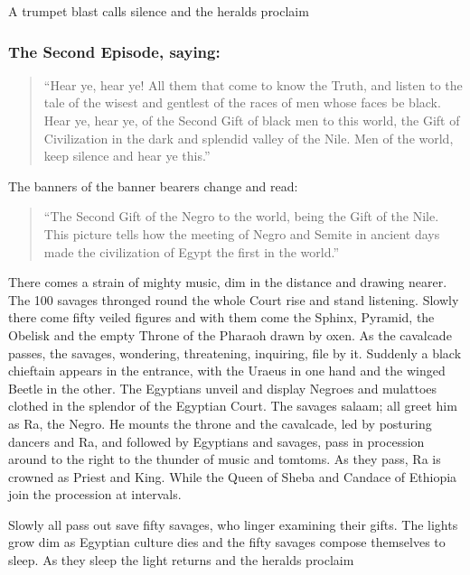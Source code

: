 \documentclass[letterpaper,10pt,english]{jupyterBook}
\begin{document}
\sphinxAtStartPar
A trumpet blast calls silence and the heralds proclaim


\subsubsection{The Second Episode, saying:}
\label{\detokenize{Volumes/06/07/national_emancipation_exposition:the-second-episode-saying}}\begin{quote}

\sphinxAtStartPar
“Hear ye, hear ye! All them that come to know the Truth, and listen to the tale of the wisest and gentlest of the races of men whose faces be black. Hear ye, hear ye, of the Second Gift of black men to this world, the Gift of Civilization in the dark and splendid valley of the Nile. Men of the world, keep silence and hear ye this.”
\end{quote}

\sphinxAtStartPar
The banners of the banner bearers change and read:
\begin{quote}

\sphinxAtStartPar
“The Second Gift of the Negro to the world, being the Gift of the Nile. This picture tells how the meeting of Negro and Semite in ancient days made the civilization of Egypt the first in the world.”
\end{quote}

\sphinxAtStartPar
There comes a strain of mighty music, dim in the distance and drawing nearer. The 100 savages thronged round the whole Court rise and stand listening. Slowly there come fifty veiled figures and with them come the Sphinx, Pyramid, the Obelisk and the empty Throne of the Pharaoh drawn by oxen. As the cavalcade passes, the savages, wondering, threatening, inquiring, file by it. Suddenly a black chieftain appears in the entrance, with the Uraeus in one hand and the winged Beetle in the other. The Egyptians unveil and display Negroes and mulattoes clothed in the splendor of the Egyptian Court. The savages salaam; all greet him as Ra, the Negro. He mounts the throne and the cavalcade, led by posturing dancers and Ra, and followed by Egyptians and savages, pass in procession around to the right to the thunder of music and tomtoms. As they pass, Ra is crowned as Priest and King. While the Queen of Sheba and Candace of Ethiopia join the procession at intervals.

\sphinxAtStartPar
Slowly all pass out save fifty savages, who linger examining their gifts. The lights grow dim as Egyptian culture dies and the fifty savages compose themselves to sleep. As they sleep the light returns and the heralds proclaim
\end{document}
